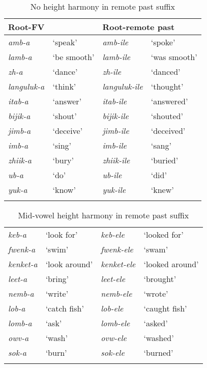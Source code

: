 \documentclass[output=paper]{langsci/langscibook}
\begin{document}
\begin{table}
\begin{tabularx}{\textwidth}{lXlX}
\lsptoprule
Root-FV & & \multicolumn{2}{l}{Root-remote past} \\
\midrule
\textit{amb-a} & ‘speak’ & \textit{amb-ile} & ‘spoke’\\
\textit{lamb-a} & ‘be smooth’ & \textit{lamb-ile} & ‘was smooth’\\
\textit{zh-a} & ‘dance’ & \textit{zh-ile} & ‘danced’ \\
\textit{languluk-a } & ‘think’ &\textit{languluk-ile} & ‘thought’ \\
\textit{itab-a } & ‘answer’ &\textit{itab-ile } & ‘answered’ \\
\textit{bijik-a } & ‘shout’ & \textit{bijik-ile } & ‘shouted’ \\
\textit{jimb-a } & ‘deceive’ & \textit{jimb-ile } & ‘deceived’ \\
\textit{imb-a } & ‘sing’ & \textit{imb-ile } & ‘sang’ \\
\textit{zhiik-a } & ‘bury’ & \textit{zhiik-ile } & ‘buried’ \\
\textit{ub-a } & ‘do’ & \textit{ub-ile } & ‘did’ \\
\textit{yuk-a } & ‘know’ &\textit{yuk-ile } & ‘knew’ \\
\lspbottomrule
\end{tabularx}

\caption{No height harmony in remote past suffix}
\label{tab:2.kawasha}

 \end{table}



\begin{table}

\begin{tabularx}{\textwidth}{lXlX}
\lsptoprule
\textit{keb-a}   & ‘look for’    & \textit{keb-ele}    & ‘looked for’    \\
\textit{fwenk-a} & ‘swim’    & \textit{fwenk-ele}  & ‘swam’  \\
\textit{kenket-a}    & ‘look around’ & \textit{kenket-ele} & ‘looked around’ \\
\textit{leet-a}  & ‘bring’   & \textit{leet-ele}   & ‘brought’   \\
\textit{nemb-a}  & ‘write’   & \textit{nemb-ele}   & ‘wrote' \\
\textit{lob-a}   & ‘catch fish’  & \textit{lob-ele}    & ‘caught fish’   \\
\textit{lomb-a}  & ‘ask’ & \textit{lomb-ele}   & ‘asked’ \\
\textit{owv-a}   & ‘wash’    & \textit{ovw-ele}    & ‘washed’    \\
\textit{sok-a}   & ‘burn’    & \textit{sok-ele}    & ‘burned’    \\
\lspbottomrule
\end{tabularx}

\caption{ Mid-vowel height harmony in remote past suffix}
\label{tab:3.kawasha}

 \end{table}
\end{document}
